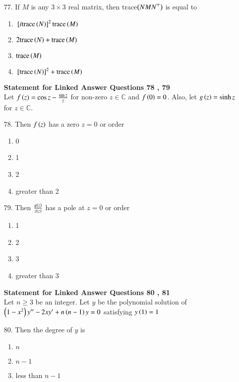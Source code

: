 \documentclass[journal,12pt,onecolumn]{IEEEtran}
\theoremstyle{remark}
\begin{document}
\begin{enumerate}
    \item[77.] If $M$ is any $3 \times 3$ real matrix, then trace$\left(NMN^{\top}\right)$ is equal to
		\hfill{}
\begin{enumerate}
    \item ${}\left[i\textnormal{trace}\left(N\right)\right]^2 \textnormal{trace}\left(M\right)$ 
    \item $2\textnormal{trace}\left(N\right) + \textnormal{trace}\left(M\right)$
    \item $\textnormal{trace}\left(M\right)$
    \item ${}\left[\textnormal{trace}\left(N\right)\right]^2 + \textnormal{trace}\left(M\right)$ 
		\end{enumerate}
\textbf{Statement for Linked Answer Questions 78 , 79}\\
Let $f\left(z\right) = \cos z - \frac{\sin z}{z}$ for non-zero $z \in \mathbb{C}$ and $f\left(0\right) = 0$.
Also, let $g\left(z\right) = \sinh z$ for $z \in \mathbb{C}$.
    \item[78.] Then $f\left(z\right)$ has a zero $z = 0$ or order 
		\hfill{}
        \begin{enumerate}
    \item 0 
    \item 1
    \item 2
    \item greater than 2
        \end{enumerate}
\item[79.] Then $\frac{g\left(z\right)}{z\left(z\right)}$ has a pole at $z = 0$ or order 
		\hfill{}
        \begin{enumerate}
    \item 1
    \item 2
    \item 3 
    \item greater than 3
        \end{enumerate}
\textbf{Statement for Linked Answer Questions 80 , 81}\\
Let $n \ge 3$ be an integer. Let $y$ be the polynomial solution of $\left(1-x^2\right)y^{\prime \prime}
-2xy^{\prime} + n\left(n-1\right)y = 0$ satisfying $y\left(1\right) = 1$
	\item[80.] Then the degree of $y$ is
		\hfill{}
        \begin{multicols}{4}
		\begin{enumerate}
			\item $n$ 
			\columnbreak
			\item $n -1$
			\columnbreak
			\item less than $n-1$

\end{enumerate}
\end{multicols}
\end{enumerate}
\end{document}
